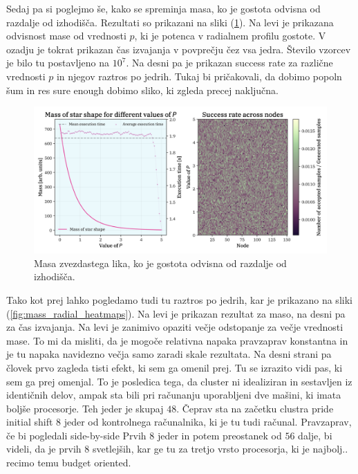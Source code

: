 \documentclass[a4paper]{article}
\begin{document}
Sedaj pa si poglejmo še, kako se spreminja masa, ko je gostota odvisna od razdalje od izhodišča. Rezultati so
prikazani na sliki (\ref{fig:mass_radial}). Na levi je prikazana odvisnost mase od vrednosti $p$, ki je potenca
v radialnem profilu gostote. V ozadju je tokrat prikazan čas izvajanja v povprečju čez vsa jedra. Število vzorcev 
je bilo tu postavljeno na $10^7$. Na desni pa je prikazan success rate za različne vrednosti $p$ in njegov 
raztros po jedrih. Tukaj bi pričakovali, da dobimo popoln šum in res sure enough dobimo sliko, ki zgleda precej 
naključna. 

\begin{figure}[H]
    \centering
    \includegraphics[width=\textwidth]{../StarShapes/Images/mass_radial.png}
    \caption{Masa zvezdastega lika, ko je gostota odvisna od razdalje od izhodišča.}
    \label{fig:mass_radial}
\end{figure}

Tako kot prej lahko pogledamo tudi tu raztros po jedrih, kar je prikazano na sliki (\ref{fig:mass_radial_heatmaps}).
Na levi je prikazan rezultat za maso, na desni pa za čas izvajanja. Na levi je zanimivo opaziti večje odstopanje
za večje vrednosti mase. To mi da misliti, da je mogoče relativna napaka pravzaprav konstantna in je tu napaka navidezno 
večja samo zaradi skale rezultata. Na desni strani pa človek prvo zagleda tisti efekt, ki sem ga omenil prej. Tu se izrazito
vidi pas, ki sem ga prej omenjal. To je posledica tega, da cluster ni idealiziran in sestavljen iz identičnih delov, ampak 
sta bili pri računanju uporabljeni dve mašini, ki imata boljše procesorje. Teh jeder je skupaj $48$. Čeprav sta na začetku clustra 
pride initial shift $8$ jeder od kontrolnega računalnika, ki je tu tudi računal. Pravzaprav, če bi pogledali side-by-side
Prvih $8$ jeder in potem preostanek od $56$ dalje, bi videli, da je prvih $8$ svetlejših, kar ge tu za tretjo vrsto 
procesorja, ki je najbolj.. recimo temu budget oriented. \\
\end{document}
